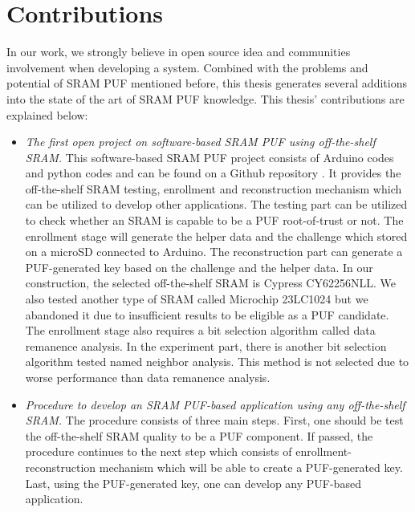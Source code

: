 \section{Contributions}
In our work, we strongly believe in open source idea and communities involvement when developing a system. Combined with the problems and potential of SRAM PUF mentioned before,
this thesis generates several additions into the state of the art of SRAM PUF knowledge. This thesis' contributions are explained below:
\begin{itemize}
    \item \textit{The first open project on software-based SRAM PUF using off-the-shelf SRAM.}
    This software-based SRAM PUF project consists of Arduino codes and python codes and can be found on a Github repository \cite{repository}. It provides the off-the-shelf SRAM testing, enrollment and reconstruction mechanism which can be utilized to develop other applications. The testing part can be utilized to check whether an SRAM is capable to be a PUF root-of-trust or not. The enrollment stage will generate the helper data and the challenge which stored on a microSD connected to Arduino. The reconstruction part can generate a PUF-generated key based on the challenge and the helper data. In our construction, the selected off-the-shelf SRAM is Cypress CY62256NLL. We also tested another type of SRAM called Microchip 23LC1024 but we abandoned it due to insufficient results to be eligible as a PUF candidate. The enrollment stage also requires a bit selection algorithm called data remanence analysis. In the experiment part, there is another bit selection algorithm tested named neighbor analysis. This method is not selected due to worse performance than data remanence analysis.
    \item \textit{Procedure to develop an SRAM PUF-based application using any off-the-shelf SRAM.} The procedure consists of three main steps. First, one should be test the off-the-shelf SRAM quality to be a PUF component. If passed, the procedure continues to the next step which consists of enrollment-reconstruction mechanism which will be able to create a PUF-generated key. Last, using the PUF-generated key, one can develop any PUF-based application.

\end{itemize}

